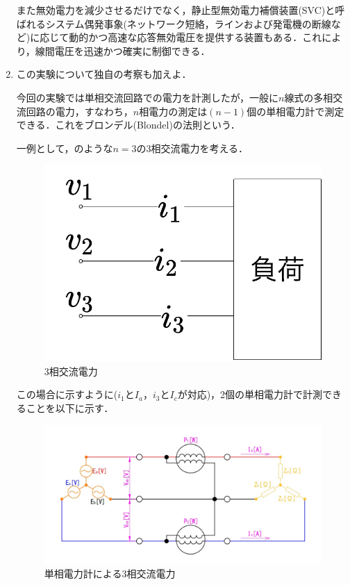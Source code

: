 \begin{enumerate}[1.)]
	また無効電力を減少させるだけでなく，静止型無効電力補償装置(SVC)と呼ばれるシステム偶発事象(ネットワーク短絡，ラインおよび発電機の断線など)に応じて動的かつ高速な応答無効電圧を提供する装置もある．これにより，線間電圧を迅速かつ確実に制御できる\cite{padsfuvg}．
	
	\item この実験について独自の考察も加えよ\cite{hsdap}．
	
	今回の実験では単相交流回路での電力を計測したが，一般に$n$線式の多相交流回路の電力，すなわち，$n$相電力の測定は$(n-1)$個の単相電力計で測定できる．これをブロンデル(Blondel)の法則という．
	
	一例として，のような$n=3$の3相交流電力を考える．
	\begin{figure}[h]
	\centering
	\includegraphics[scale=0.5]{./fig/three.pdf}
	\caption{3相交流電力}
	\label{fig:three}
	\end{figure}
	
	この場合に示すように($i_{1}$と$I_{a}$，$i_{3}$と$I_{c}$が対応)，2個の単相電力計で計測できることを以下に示す．

	\begin{figure}[h]
	\centering
	\includegraphics[scale=0.5]{./fig/threeby2.png}
	\caption{単相電力計による3相交流電力\cite{ffvds}}
	\label{fig:threeby2}
	\end{figure}
		

\end{enumerate}
